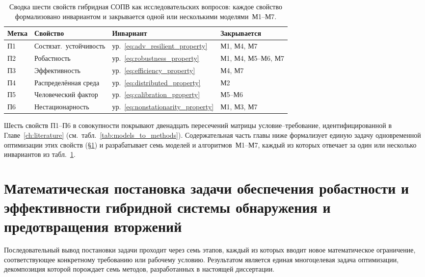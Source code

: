 \begin{table}[H]
\centering
\caption{Сводка шести свойств гибридная СОПВ как исследовательских
вопросов: каждое свойство формализовано инвариантом и закрывается
одной или несколькими моделями~М1--М7.}
\label{tab:six_properties}
\small
\setlength{\tabcolsep}{4pt}
\begin{tabular}{l p{2.3cm} p{5.5cm} p{3.5cm}}
\toprule
\textbf{Метка} & \textbf{Свойство} & \textbf{Инвариант} & \textbf{Закрывается} \\
\midrule
П1 & Состязат.\ устойчивость       & ур.~\eqref{eq:adv_resilient_property}      & М1, М4, М7 \\
П2 & Робастность                   & ур.~\eqref{eq:robustness_property}        & М1, М4, М5--М6, М7 \\
П3 & Эффективность                 & ур.~\eqref{eq:efficiency_property}        & М4, М7 \\
П4 & Распределённая среда          & ур.~\eqref{eq:distributed_property}       & М2 \\
П5 & Человеческий фактор           & ур.~\eqref{eq:calibration_property}       & М5--М6 \\
П6 & Нестационарность              & ур.~\eqref{eq:nonstationarity_property}   & М1, М3, М7 \\
\bottomrule
\end{tabular}
\end{table}

Шесть свойств П1--П6 в совокупности покрывают двенадцать пересечений
матрицы условие--требование, идентифицированной в Главе~\ref{ch:literature}
(см.~табл.~\ref{tab:models_to_methods}). Содержательная часть главы
ниже формализует единую задачу одновременной оптимизации этих
свойств (\S\ref{sec:unified_problem}) и разрабатывает семь моделей
и алгоритмов~М1--М7, каждый из которых отвечает за один или несколько
инвариантов из табл.~\ref{tab:six_properties}.


\section{Математическая постановка задачи обеспечения робастности и эффективности гибридной системы обнаружения и предотвращения вторжений}
\label{sec:unified_problem}
\label{sec:problem_statement}

Последовательный вывод постановки задачи проходит через семь этапов, каждый из которых вводит новое математическое ограничение, соответствующее конкретному требованию или рабочему условию. Результатом является единая многоцелевая задача оптимизации, декомпозиция которой порождает семь методов, разработанных в настоящей диссертации.


